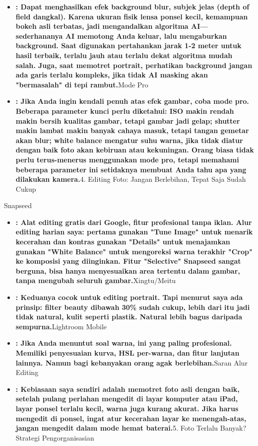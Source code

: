 \begin{itemize}
  \item \textbf{: Dapat menghasilkan efek background blur, subjek jelas (depth of field dangkal). Karena ukuran fisik lensa ponsel kecil, kemampuan bokeh asli terbatas, jadi mengandalkan algoritma AI—sederhananya AI memotong Anda keluar, lalu mengaburkan background. Saat digunakan pertahankan jarak 1-2 meter untuk hasil terbaik, terlalu jauh atau terlalu dekat algoritma mudah salah. Juga, saat memotret portrait, perhatikan background jangan ada garis terlalu kompleks, jika tidak AI masking akan "bermasalah" di tepi rambut.}Mode Pro
  \item \textbf{: Jika Anda ingin kendali penuh atas efek gambar, coba mode pro. Beberapa parameter kunci perlu diketahui: ISO makin rendah makin bersih kualitas gambar, tetapi gambar jadi gelap; shutter makin lambat makin banyak cahaya masuk, tetapi tangan gemetar akan blur; white balance mengatur suhu warna, jika tidak diatur dengan baik foto akan kebiruan atau kekuningan. Orang biasa tidak perlu terus-menerus menggunakan mode pro, tetapi memahami beberapa parameter ini setidaknya membuat Anda tahu apa yang dilakukan kamera.}4. Editing Foto: Jangan Berlebihan, Tepat Saja Sudah Cukup
\end{itemize}


Snapseed

\begin{itemize}
  \item \textbf{: Alat editing gratis dari Google, fitur profesional tanpa iklan. Alur editing harian saya: pertama gunakan "Tune Image" untuk menarik kecerahan dan kontras gunakan "Details" untuk menajamkan gunakan "White Balance" untuk mengoreksi warna terakhir "Crop" ke komposisi yang diinginkan. Fitur "Selective" Snapseed sangat berguna, bisa hanya menyesuaikan area tertentu dalam gambar, tanpa mengubah seluruh gambar.}Xingtu/Meitu
  \item \textbf{: Keduanya cocok untuk editing portrait. Tapi menurut saya ada prinsip: filter beauty dibawah 30\% sudah cukup, lebih dari itu jadi tidak natural, kulit seperti plastik. Natural lebih bagus daripada sempurna.}Lightroom Mobile
  \item \textbf{: Jika Anda menuntut soal warna, ini yang paling profesional. Memiliki penyesuaian kurva, HSL per-warna, dan fitur lanjutan lainnya. Namun bagi kebanyakan orang agak berlebihan.}Saran Alur Editing
  \item \textbf{: Kebiasaan saya sendiri adalah memotret foto asli dengan baik, setelah pulang perlahan mengedit di layar komputer atau iPad, layar ponsel terlalu kecil, warna juga kurang akurat. Jika harus mengedit di ponsel, ingat atur kecerahan layar ke menengah-atas, jangan mengedit dalam mode hemat baterai.}5. Foto Terlalu Banyak? Strategi Pengorganisasian
\end{itemize}

